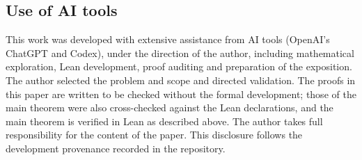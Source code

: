 \documentclass[11pt]{amsart}
\theoremstyle{definition}
\theoremstyle{remark}
\begin{document}
\subsection*{Use of AI tools}
This work was developed with extensive assistance from AI tools (\mbox{OpenAI's}
ChatGPT and Codex), under the direction of the author, including
mathematical exploration, Lean development, proof auditing and preparation
of the exposition. The author
selected the problem and scope and directed validation. The proofs in this
paper are written to be checked without the formal development; those of the
main theorem were also cross-checked against the Lean declarations, and the
main theorem is verified in Lean as described above. The author takes full
responsibility for the content of the paper. This disclosure follows the
development provenance recorded in the repository.



\end{document}
